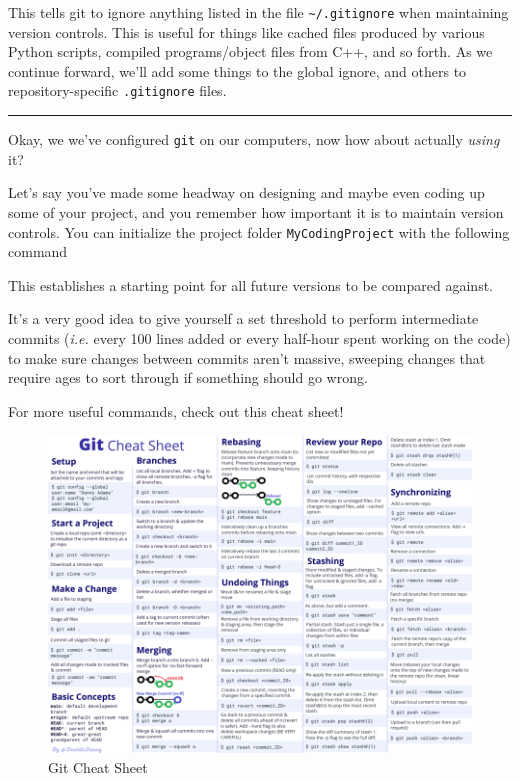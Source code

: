 This tells git to ignore anything listed in the file
\texttt{\textasciitilde{}/.gitignore} when maintaining version controls.
This is useful for things like cached files produced by various Python
scripts, compiled programs/object files from C++, and so forth. As we
continue forward, we'll add some things to the global ignore, and others
to repository-specific \texttt{.gitignore} files.

\begin{center}\rule{0.5\linewidth}{0.5pt}\end{center}

Okay, we we've configured \texttt{git} on our computers, now how about
actually \emph{using} it?

Let's say you've made some headway on designing and maybe even coding up
some of your project, and you remember how important it is to maintain
version controls. You can initialize the project folder
\texttt{MyCodingProject} with the following command

\begin{Shaded}
\begin{Highlighting}[]
\end{Highlighting}
\end{Shaded}

This establishes a starting point for all future versions to be compared
against.

It's a very good idea to give yourself a set threshold to perform intermediate commits (\emph{i.e.} every 100 lines added or every half-hour spent working on the code) to make sure changes between commits aren't massive, sweeping changes that require ages to sort through if something should go wrong.

For more useful commands, check out this cheat sheet!

\begin{figure}
\centering
\includegraphics{Images/GitCheatSheet.png}
\caption{Git Cheat Sheet}
\end{figure}
\FloatBarrier
